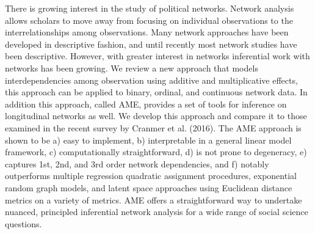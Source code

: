 There is growing interest in the study of political networks. Network analysis allows scholars to move away from focusing on individual observations to the interrelationships among observations. Many network approaches have been developed in descriptive fashion, and until recently most network studies have been descriptive. However, with greater interest in networks inferential work with networks has been growing. We review a new approach that models interdependencies among observation using additive and multiplicative effects, this approach can be applied to binary, ordinal, and continuous network data. In addition this approach, called AME, provides a set of tools for inference on longitudinal networks as well. We develop this approach and compare it to those examined in the recent survey by Cranmer et al. (2016).  The AME approach is shown to be a) easy to implement, b) interpretable in a general linear model framework, c) computationally straightforward, d) is not prone to degeneracy, e) captures 1st, 2nd, and 3rd order network dependencies, and f) notably outperforms multiple regression quadratic assignment procedures, exponential random graph models, and latent space approaches using Euclidean distance metrics on a variety of metrics. AME offers a straightforward way to undertake nuanced, principled inferential network analysis for a wide range of social science questions. 

